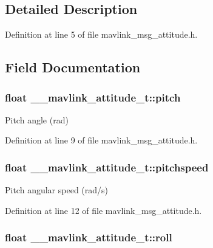 \subsection{Detailed Description}


Definition at line 5 of file mavlink\-\_\-msg\-\_\-attitude.\-h.



\subsection{Field Documentation}
\hypertarget{struct____mavlink__attitude__t_ad9be17d1bb5941060e7c81634ebec51c}{
\subsubsection[{pitch}]{\setlength{\rightskip}{0pt plus 5cm}float \-\_\-\-\_\-mavlink\-\_\-attitude\-\_\-t\-::pitch}}\label{struct____mavlink__attitude__t_ad9be17d1bb5941060e7c81634ebec51c}


Pitch angle (rad) 



Definition at line 9 of file mavlink\-\_\-msg\-\_\-attitude.\-h.

\hypertarget{struct____mavlink__attitude__t_a6496f9102154455ef47db7c0cab5c141}{
\subsubsection[{pitchspeed}]{\setlength{\rightskip}{0pt plus 5cm}float \-\_\-\-\_\-mavlink\-\_\-attitude\-\_\-t\-::pitchspeed}}\label{struct____mavlink__attitude__t_a6496f9102154455ef47db7c0cab5c141}


Pitch angular speed (rad/s) 



Definition at line 12 of file mavlink\-\_\-msg\-\_\-attitude.\-h.

\hypertarget{struct____mavlink__attitude__t_a5ac57ac7109bca27a72d5a4128a8010f}{
\subsubsection[{roll}]{\setlength{\rightskip}{0pt plus 5cm}float \-\_\-\-\_\-mavlink\-\_\-attitude\-\_\-t\-::roll}}\label{struct____mavlink__attitude__t_a5ac57ac7109bca27a72d5a4128a8010f}


